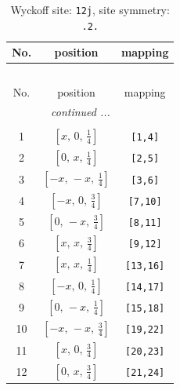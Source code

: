 \documentclass[fleqn,8pt]{jsarticle}
\begin{document}
\begin{longtable}{ccc}
\caption{Wyckoff site: {\tt 12j}, site symmetry: {\tt .2.}}
 \\
 \hline \hline
No. & position & mapping \\ \hline \endfirsthead

\multicolumn{2}{l}{\tablename\ \thetable{}} \\
 \hline \hline
No. & position & mapping \\ \hline \endhead

 \hline \hline
\multicolumn{2}{r}{\footnotesize\it continued ...} \\ \endfoot

 \hline \hline
\multicolumn{2}{r}{} \\ \endlastfoot

1 & $\left[ x,\, 0,\, \frac{1}{4} \right]$ & {\tt [1,4]} \\ \hline
2 & $\left[ 0,\, x,\, \frac{1}{4} \right]$ & {\tt [2,5]} \\ \hline
3 & $\left[ - x,\, - x,\, \frac{1}{4} \right]$ & {\tt [3,6]} \\ \hline
4 & $\left[ - x,\, 0,\, \frac{3}{4} \right]$ & {\tt [7,10]} \\ \hline
5 & $\left[ 0,\, - x,\, \frac{3}{4} \right]$ & {\tt [8,11]} \\ \hline
6 & $\left[ x,\, x,\, \frac{3}{4} \right]$ & {\tt [9,12]} \\ \hline
7 & $\left[ x,\, x,\, \frac{1}{4} \right]$ & {\tt [13,16]} \\ \hline
8 & $\left[ - x,\, 0,\, \frac{1}{4} \right]$ & {\tt [14,17]} \\ \hline
9 & $\left[ 0,\, - x,\, \frac{1}{4} \right]$ & {\tt [15,18]} \\ \hline
10 & $\left[ - x,\, - x,\, \frac{3}{4} \right]$ & {\tt [19,22]} \\ \hline
11 & $\left[ x,\, 0,\, \frac{3}{4} \right]$ & {\tt [20,23]} \\ \hline
12 & $\left[ 0,\, x,\, \frac{3}{4} \right]$ & {\tt [21,24]} \\
\end{longtable}
\renewcommand{\arraystretch}{1.2}
\end{document}
